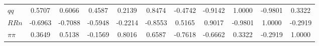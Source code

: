 \begin{center}
\begin{longtable}{lcccccccccc}
$qq         $	 & 	     0.5707	 & 	     0.6066	 & 	     0.4587	 & 	     0.2139	 & 	     0.8474	 & 	    -0.4742	 & 	    -0.9142	 & 	     1.0000	 & 	    -0.9801	 & 	     0.3322 \\ 
$RRn        $	 & 	    -0.6963	 & 	    -0.7088	 & 	    -0.5948	 & 	    -0.2214	 & 	    -0.8553	 & 	     0.5165	 & 	     0.9017	 & 	    -0.9801	 & 	     1.0000	 & 	    -0.2919 \\ 
$\pi\pi     $	 & 	     0.3649	 & 	     0.5138	 & 	    -0.1569	 & 	     0.8016	 & 	     0.6587	 & 	    -0.7618	 & 	    -0.6662	 & 	     0.3322	 & 	    -0.2919	 & 	     1.0000 \\ 
\end{longtable}
 \end{center}
